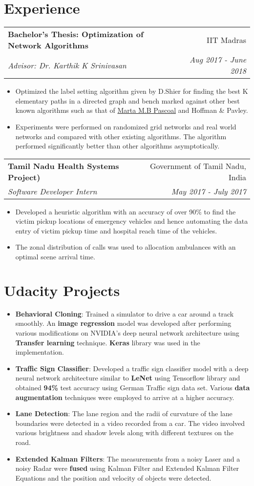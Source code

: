 \documentclass[letterpaper,11pt]{article}
\makeatletter
\newcommand{\resumeItem}[2]{
  \item\small{
    \textbf{#1}{: #2 \vspace{-2pt}}
  }
}
\newcommand{\ritem}[1]{
  \item\small{
    {#1 \vspace{-2pt}}
  }
}
\newcommand{\resumeSubheading}[4]{
  \vspace{-1pt}\item
    \begin{tabular*}{0.97\textwidth}{l@{\extracolsep{\fill}}r}
      \textbf{#1} & #2 \\
      \textit{#3} & \textit{#4} \\
    \end{tabular*}\vspace{-5pt}
}
\newcommand{\resumeSubItem}[2]{\resumeItem{#1}{#2}\vspace{-4pt}}
\newcommand{\resumeSubHeadingListStart}{\begin{description}[leftmargin=*]}
\newcommand{\resumeSubHeadingListEnd}{\end{description}\vspace{-6pt}}
\newcommand{\resumeItemListStart}{\begin{itemize}[leftmargin=*]}
\newcommand{\resumeItemListEnd}{\end{itemize}\vspace{-4pt}}
\makeatother
\begin{document}
\section{Experience}
  \resumeSubHeadingListStart
    \resumeSubheading
      {Bachelor’s Thesis: Optimization of Network Algorithms}{IIT Madras}
      {Advisor: Dr. Karthik K Srinivasan}{Aug 2017 - June 2018}
      \justifying\resumeItemListStart
        \ritem{Optimized the label setting algorithm given by D.Shier for finding the best K elementary paths in a directed graph and bench marked against other best known algorithms such as that of \href{http://www.dis.uniroma1.it/challenge9/papers/pascoal.pdf}{Marta M.B Pascoal} and Hoffman \& Pavley.}
        \ritem{Experiments were performed on randomized grid networks and real world networks and compared with other existing algorithms. The algorithm performed significantly better than other algorithms asymptotically.}
      \resumeItemListEnd
      
    \resumeSubheading
      {Tamil Nadu Health Systems Project)}{Government of Tamil Nadu, India}
      {Software Developer Intern}{May 2017 - July 2017}
      \justifying\resumeItemListStart
        \ritem
          {Developed a heuristic algorithm with an accuracy of over 90\% to find the victim pickup locations of emergency vehicles and hence automating the data entry of victim pickup time and hospital reach time of the vehicles.}
        \ritem
          {The zonal distribution of calls was used to allocation ambulances with an optimal scene arrival time.}
      \resumeItemListEnd

  \resumeSubHeadingListEnd

\section{Udacity Projects}
  \resumeItemListStart
    \justifying\resumeSubItem{Behavioral Cloning}
      {Trained a simulator to drive a car around a track smoothly. An \textbf{image regression} model was developed after performing various modifications on NVIDIA's deep neural network architecture using \textbf{Transfer learning} technique. \textbf{Keras} library was used in the implementation.}
    \justifying\resumeSubItem{Traffic Sign Classifier}
      {Developed a traffic sign classifier model with a deep neural network architecture similar to \textbf{LeNet} using Tensorflow library and obtained \textbf{94\%} test accuracy using German Traffic sign data set. Various \textbf{data augmentation} techniques were employed to arrive at a higher accuracy.}
    \justifying\resumeSubItem{Lane Detection}
      {The lane region and the radii of curvature of the lane boundaries were detected in a video recorded from a car. The video involved various brightness and shadow levels along with different textures on the road.}
    \justifying\resumeSubItem{Extended Kalman Filters}
      {The measurements from a noisy Laser and a noisy Radar were \textbf{fused} using Kalman Filter and Extended Kalman Filter Equations and the position and velocity of objects were detected.}
  \resumeItemListEnd
\end{document}
